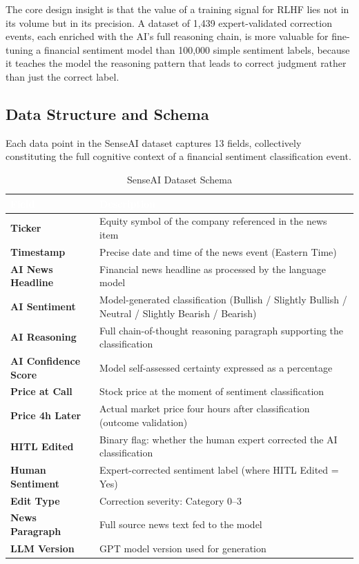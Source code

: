 \documentclass[11pt,a4paper]{article}
\begin{document}
The core design insight is that the value of a training signal for RLHF lies not in its
volume but in its precision. A dataset of 1,439 expert-validated correction events,
each enriched with the AI's full reasoning chain, is more valuable for fine-tuning a
financial sentiment model than 100,000 simple sentiment labels, because it teaches
the model the reasoning pattern that leads to correct judgment rather than just the
correct label.

\subsection{Data Structure and Schema}

Each data point in the SenseAI dataset captures 13 fields, collectively constituting
the full cognitive context of a financial sentiment classification event.

\begin{table}[H]
\centering
\caption{SenseAI Dataset Schema}
\label{tab:schema}
\renewcommand{\arraystretch}{1.35}
\begin{tabularx}{\textwidth}{>{\bfseries\color{darkblue}}p{3.2cm} X}
\toprule
\rowcolor{headerblue}
\textcolor{white}{\textbf{Field}} & \textcolor{white}{\textbf{Description}} \\
\midrule
Ticker & Equity symbol of the company referenced in the news item \\
\rowcolor{rowgray}
Timestamp & Precise date and time of the news event (Eastern Time) \\
AI News Headline & Financial news headline as processed by the language model \\
\rowcolor{rowgray}
AI Sentiment & Model-generated classification (Bullish / Slightly Bullish / Neutral / Slightly Bearish / Bearish) \\
AI Reasoning & Full chain-of-thought reasoning paragraph supporting the classification \\
\rowcolor{rowgray}
AI Confidence Score & Model self-assessed certainty expressed as a percentage \\
Price at Call & Stock price at the moment of sentiment classification \\
\rowcolor{rowgray}
Price 4h Later & Actual market price four hours after classification (outcome validation) \\
HITL Edited & Binary flag: whether the human expert corrected the AI classification \\
\rowcolor{rowgray}
Human Sentiment & Expert-corrected sentiment label (where HITL Edited = Yes) \\
Edit Type & Correction severity: Category 0--3 \\
\rowcolor{rowgray}
News Paragraph & Full source news text fed to the model \\
LLM Version & GPT model version used for generation \\
\bottomrule
\end{tabularx}
\end{table}
\end{document}

